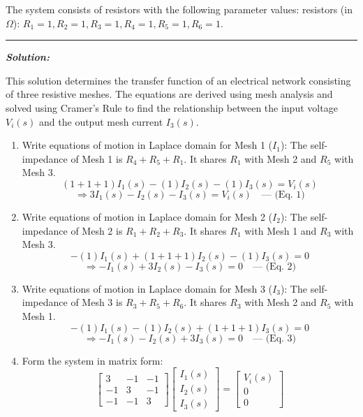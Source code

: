 \documentclass[11pt]{article}
\begin{document}
\noindent The system consists of resistors with the following parameter values: resistors (in $\Omega$): \( R_1 = 1, R_2 = 1, R_3 = 1, R_4 = 1, R_5 = 1, R_6 = 1 \).

\noindent\rule{\textwidth}{1pt}

\vspace{12pt}

\noindent \textbf{\textit{Solution:}}

\noindent This solution determines the transfer function of an electrical network consisting of three resistive meshes. The equations are derived using mesh analysis and solved using Cramer's Rule to find the relationship between the input voltage $V_i(s)$ and the output mesh current $I_3(s)$.

\begin{enumerate}[label=(\alph*), itemindent=*, leftmargin=*, nolistsep]

    \item Write equations of motion in Laplace domain for Mesh 1 ($I_1$):
    The self-impedance of Mesh 1 is $R_4 + R_5 + R_1$. It shares $R_1$ with Mesh 2 and $R_5$ with Mesh 3.
    \[
    (1 + 1 + 1)I_1(s) - (1)I_2(s) - (1)I_3(s) = V_i(s)
    \]
    \[
    \Rightarrow 3I_1(s) - I_2(s) - I_3(s) = V_i(s) \quad \text{--- (Eq. 1)}
    \]

    \item Write equations of motion in Laplace domain for Mesh 2 ($I_2$):
    The self-impedance of Mesh 2 is $R_1 + R_2 + R_3$. It shares $R_1$ with Mesh 1 and $R_3$ with Mesh 3.
    \[
    -(1)I_1(s) + (1 + 1 + 1)I_2(s) - (1)I_3(s) = 0
    \]
    \[
    \Rightarrow -I_1(s) + 3I_2(s) - I_3(s) = 0 \quad \text{--- (Eq. 2)}
    \]

    \item Write equations of motion in Laplace domain for Mesh 3 ($I_3$):
    The self-impedance of Mesh 3 is $R_3 + R_5 + R_6$. It shares $R_3$ with Mesh 2 and $R_5$ with Mesh 1.
    \[
    -(1)I_1(s) - (1)I_2(s) + (1 + 1 + 1)I_3(s) = 0
    \]
    \[
    \Rightarrow -I_1(s) - I_2(s) + 3I_3(s) = 0 \quad \text{--- (Eq. 3)}
    \]

    \item Form the system in matrix form:
    \[
    \begin{bmatrix}
    3 & -1 & -1 \\
    -1 & 3 & -1 \\
    -1 & -1 & 3
    \end{bmatrix}
    \begin{bmatrix}
    I_1(s) \\
    I_2(s) \\
    I_3(s)
    \end{bmatrix}
    =
    \begin{bmatrix}
    V_i(s) \\
    0 \\
    0
    \end{bmatrix}
    \]


\end{enumerate}
\end{document}
